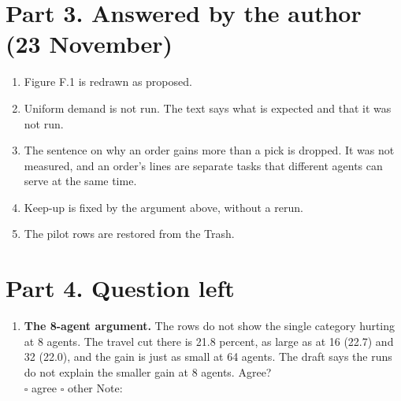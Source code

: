 \documentclass[11pt,a4paper]{article}
\begin{document}
\section*{Part 3. Answered by the author (23 November)}
\begin{enumerate}
  \item Figure F.1 is redrawn as proposed.
  \item Uniform demand is not run. The text says what is expected and that
        it was not run.
  \item The sentence on why an order gains more than a pick is dropped. It
        was not measured, and an order's lines are separate tasks that
        different agents can serve at the same time.
  \item Keep-up is fixed by the argument above, without a rerun.
  \item The pilot rows are restored from the Trash.
\end{enumerate}

\section*{Part 4. Question left}
\begin{enumerate}
  \item \textbf{The 8-agent argument.} The rows do not show the single
        category hurting at 8 agents. The travel cut there is 21.8 percent,
        as large as at 16 (22.7) and 32 (22.0), and the gain is just as small
        at 64 agents. The draft says the runs do not explain the smaller
        gain at 8 agents. Agree?
        \\ \hspace*{1em}$\square$ agree \quad $\square$ other \quad Note:
\end{enumerate}
\end{document}
